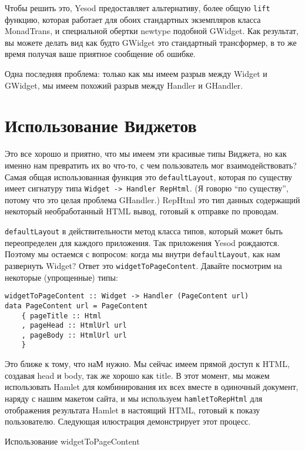 Чтобы решить это, Yesod предоставляет альтернативу, более общую \lstinline'lift' функцию, которая работает для обоих стандартных экземпляров класса MonadTrans, и специальной обертки newtype подобной GWidget. Как результат, вы можете делать вид как будто GWidget это стандартный трансформер, в то же время получая ваше приятное сообщение об ошибке.

Одна последняя проблема: только как мы имеем разрыв между Widget и GWidget, мы имеем похожий разрыв между Handler и GHandler.

\section{Использование Виджетов}

Это все хорошо и приятно, что мы имеем эти красивые типы Виджета, но как именно нам превратить их во что-то, с чем пользователь мог взаимодействовать? Самая общая использованная функция это \lstinline'defaultLayout', которая по существу имеет сигнатуру типа \lstinline'Widget -> Handler RepHtml'. (Я говорю \textquotedblleft по существу\textquotedblright, потому что это целая проблема GHandler.) RepHtml это тип данных содержащий некоторый необработанный HTML вывод, готовый к отправке по проводам.

\lstinline'defaultLayout' в действительности метод класса типов, который может быть переопределен для каждого приложения. Так приложения Yesod рождаются. Поэтому мы остаемся с вопросом: когда мы внутри \lstinline'defaultLayout', как нам развернуть Widget? Ответ это \lstinline'widgetToPageContent'. Давайте посмотрим на некоторые (упрощенные) типы:

\begin{lstlisting}
widgetToPageContent :: Widget -> Handler (PageContent url)
data PageContent url = PageContent
    { pageTitle :: Html
    , pageHead :: HtmlUrl url
    , pageBody :: HtmlUrl url
    }
\end{lstlisting}

Это ближе к тому, что наМ нужно. Мы сейчас имеем прямой доступ к HTML, создавая head и body, так же хорошо как title. В этот момент, мы можем использовать Hamlet для комбинирования их всех вместе в одиночный документ, наряду с нашим макетом сайта, и мы используем \lstinline'hamletToRepHtml' для отображения результата Hamlet в настоящий HTML, готовый к показу пользователю. Следующая илюстрация демонстрирует этот процесс.

Использование widgetToPageContent

